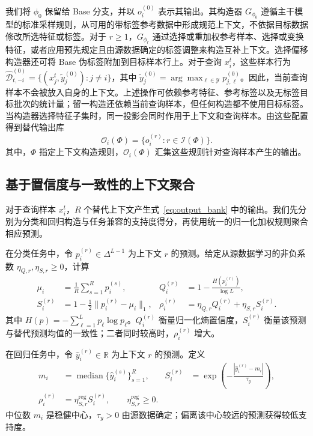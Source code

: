 我们将 $\phi_0$ 保留给 Base 分支，并以 $o_i^{(0)}$ 表示其输出。其构造器 $G_{\phi_0}$ 遵循主干模型的标准采样规则，从可用的带标签参考数据中形成规范上下文，不依据目标数据修改所选特征或标签。对于 $r\geq1$，$G_{\phi_r}$ 通过选择或重加权参考样本、选择或变换特征，或者应用预先规定且由源数据确定的标签调整来构造互补上下文。选择偏移构造器还可将 Base 伪标签附加到目标样本行上。对于查询 $x_i^t$，这些样本行为
$\widehat{\mathcal D}_{t,-i}^{(0)}=\{(x_j^t,\widetilde y_j^{(0)}):j\neq i\}$，其中 $\widetilde y_j^{(0)}=\arg\max_{\ell\in\mathcal Y}p_{j,\ell}^{(0)}$。因此，当前查询样本不会被放入自身的上下文。上述操作可依赖参考特征、参考标签以及无标签目标批次的统计量；留一构造还依赖当前查询样本，但任何构造都不使用目标标签。当构造器选择特征子集时，同一投影会同时作用于上下文和查询样本。由这些配置得到替代输出库
\begin{equation}
  \mathcal O_i(\Phi)=\{o_i^{(r)}:r\in\mathcal I(\Phi)\}.
  \label{eq:output_bank}
\end{equation}
其中，$\Phi$ 指定上下文构造规则，$\mathcal O_i(\Phi)$ 汇集这些规则针对查询样本产生的输出。

\subsection{基于置信度与一致性的上下文聚合}
\label{sec:evidence_aggregation}

对于查询样本 $x_i^t$，$R$ 个替代上下文产生式~\eqref{eq:output_bank} 中的输出。我们先分别为分类和回归构造与任务兼容的支持度得分，再使用统一的归一化加权规则聚合相应预测。

在分类任务中，令 $p_i^{(r)}\in\Delta^{L-1}$ 为上下文 $r$ 的预测。给定从源数据学习的非负系数 $\eta_{Q,r},\eta_{S,r}\geq0$，计算
\begin{equation}
  \begin{aligned}
    \mu_i&=\frac{1}{R}\sum_{s=1}^{R}p_i^{(s)},
    &Q_i^{(r)}&=1-\frac{H(p_i^{(r)})}{\log L},\\
    S_i^{(r)}&=1-\frac12\lVert p_i^{(r)}-\mu_i\rVert_1,
    &\rho_i^{(r)}&=\eta_{Q,r}Q_i^{(r)}+\eta_{S,r}S_i^{(r)}.
  \end{aligned}
  \label{eq:classification_evidence}
\end{equation}
其中 $H(p)=-\sum_{\ell=1}^{L}p_\ell\log p_\ell$。$Q_i^{(r)}$ 衡量归一化熵置信度，$S_i^{(r)}$ 衡量该预测与替代预测均值的一致性；二者同时较高时，$\rho_i^{(r)}$ 增大。

在回归任务中，令 $\hat y_i^{(r)}\in\mathbb R$ 为上下文 $r$ 的预测。定义
\begin{equation}
  \begin{aligned}
    m_i&=\operatorname{median}\{\hat y_i^{(s)}\}_{s=1}^{R},
    &S_i^{(r)}&=\exp\!\left(-\frac{|\hat y_i^{(r)}-m_i|}{\tau_y}\right),\\
    \rho_i^{(r)}&=\eta_{S,r}^{\mathrm{reg}}S_i^{(r)},
    \qquad \eta_{S,r}^{\mathrm{reg}}\geq0.
  \end{aligned}
  \label{eq:regression_evidence}
\end{equation}
中位数 $m_i$ 是稳健中心，$\tau_y>0$ 由源数据确定；偏离该中心较远的预测获得较低支持度。

